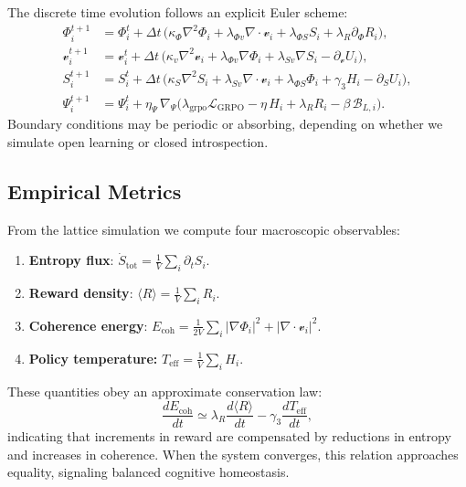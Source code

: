 \documentclass[11pt]{article}
\begin{document}
The discrete time evolution follows an explicit Euler scheme:
\[
\begin{aligned}
\Phi_i^{t+1} &= \Phi_i^t + \Delta t\,
  \big(\kappa_\Phi\nabla^2\Phi_i
  +\lambda_{\Phi v}\nabla\!\cdot\!\mathcal{v}_i
  +\lambda_{\Phi S}S_i
  +\lambda_R\partial_\Phi R_i
  \big),\\[3pt]
\mathcal{v}_i^{t+1} &= \mathcal{v}_i^t + \Delta t\,
  \big(\kappa_v\nabla^2\mathcal{v}_i
  +\lambda_{\Phi v}\nabla\Phi_i
  +\lambda_{Sv}\nabla S_i
  -\partial_{\mathcal{v}}U_i
  \big),\\[3pt]
S_i^{t+1} &= S_i^t + \Delta t\,
  \big(\kappa_S\nabla^2 S_i
  +\lambda_{Sv}\nabla\!\cdot\!\mathcal{v}_i
  +\lambda_{\Phi S}\Phi_i
  +\gamma_3 H_i
  -\partial_S U_i
  \big),\\[3pt]
\Psi_i^{t+1} &= \Psi_i^t + \eta_\Psi\,\nabla_\Psi
  \big(\lambda_{\mathrm{grpo}}\mathcal{L}_{\mathrm{GRPO}} 
  - \eta\,H_i
  + \lambda_R R_i
  - \beta\,\mathcal{B}_{L,i}\big).
\end{aligned}
\]
Boundary conditions may be periodic or absorbing, depending on whether we simulate open learning or closed introspection.

\subsection{Empirical Metrics}

From the lattice simulation we compute four macroscopic observables:

\begin{enumerate}
  \item \textbf{Entropy flux}:
  $\dot{S}_{\mathrm{tot}} = \frac{1}{V}\sum_i \partial_t S_i$.
  \item \textbf{Reward density}:
  $\langle R \rangle = \frac{1}{V}\sum_i R_i$.
  \item \textbf{Coherence energy}:
  $E_{\mathrm{coh}} = \frac{1}{2V}\sum_i |\nabla \Phi_i|^2 + |\nabla\!\cdot\!\mathcal{v}_i|^2$.
  \item \textbf{Policy temperature:}
  $T_{\mathrm{eff}} = \frac{1}{V}\sum_i H_i$.
\end{enumerate}

These quantities obey an approximate conservation law:
\[
\frac{dE_{\mathrm{coh}}}{dt}
\simeq \lambda_R \frac{d\langle R\rangle}{dt}
- \gamma_3 \frac{dT_{\mathrm{eff}}}{dt},
\]
indicating that increments in reward are compensated by reductions in entropy and increases in coherence.  
When the system converges, this relation approaches equality, signaling balanced cognitive homeostasis.
\end{document}
